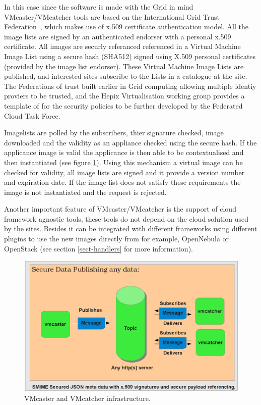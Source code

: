 \documentclass{llncs_Ibergrid2013}
\begin{document}
In this case since the software is made with the Grid in mind VMcaster/VMcatcher tools are based on the International Grid Trust Federation~\cite{igtf}, which makes use of x.509 certificate authentication model. All the image lists are signed by an authenticated endorser with a personal x.509 certificate. All images are securly referanced referenced in a Virtual Machine Image List using a secure hash (SHA512) signed using X.509 personal certificates (provided by the image list endorser). These Virtual Machine Image Lists are published, and interested sites subscribe to the Lists in a catalogue at the site. The Federations of trust built earlier in Grid computing allowing multiple identiy proviers to be trusted, and the Hepix Virtualisation working group provides a template of for the security policies to be further developed by the Federated Cloud Task Force.

Imagelists are polled by the subscribers, thier signature checked, image downloaded and the validity as an appliance checked using the secure hash. If the applicance image is valid the applicance is then able to be contextualised and then instantiated (see figure \ref{fig:infrastructure}). 
Using this mechanism a virtual image can be checked for validity, all image lists are signed and it provide a version number and expiration date. If the image list does not satisfy these requirements the image is not instantiated and the request is rejected.

Another important feature of VMcaster/VMcatcher is the support of cloud framework agnostic tools, these tools do not depend on the cloud solution used by the sites. Besides it can be integrated with different frameworks using different plugins to use the new images directly from for example, OpenNebula or OpenStack (see section \ref{sect-handlers} for more information).

\begin{figure}[h]
\centering
\includegraphics[width=1\textwidth]{vmcaster_vmcatcher.png}
\caption{VMcaster and VMcatcher infrastructure.}
\label{fig:infrastructure}
\end{figure}
\end{document}
